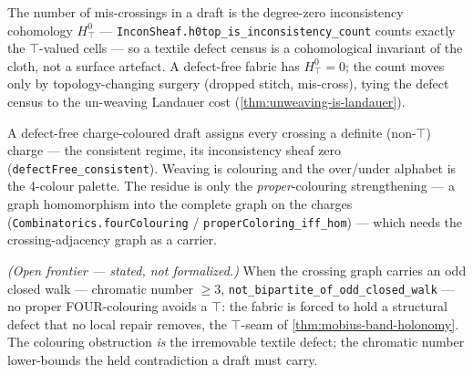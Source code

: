 \begin{theorem}\label{thm:defect-count-is-h0top}\leanok{}
The number of mis-crossings in a draft is
the degree-zero inconsistency cohomology $H^0_{\top}$ --- \texttt{InconSheaf.h0top\_is\_inconsistency\_count}
counts exactly the $\top$-valued cells --- so a textile defect census is a cohomological
invariant of the cloth, not a surface artefact. A defect-free fabric has $H^0_{\top}=0$; the
count moves only by topology-changing surgery (dropped stitch, mis-cross), tying the defect
census to the un-weaving Landauer cost (\cref{thm:unweaving-is-landauer}).
\end{theorem}

\begin{theorem}\label{thm:proper-colouring-is-defectfree}\leanok{}
A defect-free charge-coloured draft assigns every crossing a definite (non-$\top$) charge --- the
consistent regime, its inconsistency sheaf zero (\texttt{defectFree\_consistent}). Weaving is
colouring and the over/under alphabet is the 4-colour palette. The residue is only the
\emph{proper}-colouring strengthening --- a graph homomorphism into the complete graph on the
charges (\texttt{Combinatorics.fourColouring} / \texttt{properColoring\_iff\_hom}) --- which needs
the crossing-adjacency graph as a carrier.
\end{theorem}

\begin{theorem}\label{thm:chromatic-obstruction-structural-defect}\notready{}
\emph{(Open frontier --- stated, not formalized.)} When the crossing graph carries an odd
closed walk --- chromatic number $\ge 3$, \texttt{not\_bipartite\_of\_odd\_closed\_walk} --- no
proper FOUR-colouring avoids a $\top$: the fabric is forced to hold a structural defect that no
local repair removes, the $\top$-seam of \cref{thm:mobius-band-holonomy}. The colouring
obstruction \emph{is} the irremovable textile defect; the chromatic number lower-bounds the
held contradiction a draft must carry.
\end{theorem}

